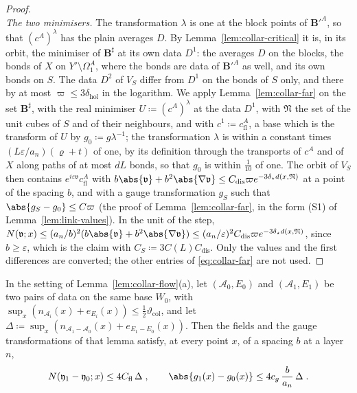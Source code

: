 \begin{proof}
\[\]
\emph{The two minimisers.} The transformation $\lambda$ is one at the block points of $\mathbf B'^A$, so that $(c^A)^\lambda$ has the plain averages $D$. By Lemma~\ref{lem:collar-critical} it is, in its orbit, the minimiser of $\mathbf B^\sharp$ at its own data $D^1$: the averages $D$ on the blocks, the bonds of $X$ on $Y' \setminus \Omega^A_1$, where the bonds are data of $\mathbf B'^A$ as well, and its own bonds on $S$. The data $D^2$ of $V_S$ differ from $D^1$ on the bonds of $S$ only, and there by at most $\varpi \leq 3\delta_{\mathrm{hol}}$ in the logarithm. We apply Lemma~\ref{lem:collar-far} on the set $\mathbf B^\sharp$, with the real minimiser $U \coloneqq (c^A)^\lambda$ at the data $D^1$, with $\mathfrak N$ the set of the unit cubes of $S$ and of their neighbours, and with $c^1 \coloneqq c^A_{\mathrm{fl}}$, a base which is the transform of $U$ by $g_0 \coloneqq g\lambda^{-1}$; the transformation $\lambda$ is within a constant times $(L\varepsilon/a_n)(\varrho + t)$ of one, by its definition through the transports of $c^A$ and of $X$ along paths of at most $dL$ bonds, so that $g_0$ is within $\frac{1}{10}$ of one. The orbit of $V_S$ then contains $e^{i\varepsilon\mathfrak v}c^A_{\mathrm{fl}}$ with $b\abs{\mathfrak v} + b^2\abs{\nabla\mathfrak v} \leq C_{\mathrm{dis}}\varpi e^{-3\delta_\star d(x,\mathfrak N)}$ at a point of the spacing $b$, and with a gauge transformation $g_S$ such that $\abs{g_S - g_0} \leq C\varpi$ (the proof of Lemma~\ref{lem:collar-far}, in the form (S1) of Lemma~\ref{lem:link-values}). In the unit of the step, $N(\mathfrak v; x) \leq (a_n/b)^2(b\abs{\mathfrak v} + b^2\abs{\nabla\mathfrak v}) \leq (a_n/\varepsilon)^2C_{\mathrm{dis}}\varpi e^{-3\delta_\star d(x,\mathfrak N)}$, since $b \geq \varepsilon$, which is the claim with $C_S \coloneqq 3C(L)C_{\mathrm{dis}}$. Only the values and the first differences are converted; the other entries of \eqref{eq:collar-far} are not used.
\end{proof}


\begin{lemma}\label{lem:data-analytic}
In the setting of Lemma~\ref{lem:collar-flow}(a), let $(\mathcal A_0, E_0)$ and $(\mathcal A_1, E_1)$ be two pairs of data on the same base $W_0$, with $\sup_x(n_{\mathcal A_i}(x) + e_{E_i}(x)) \leq \frac{1}{2}\vartheta_{\mathrm{col}}$, and let $\Delta \coloneqq \sup_x(n_{\mathcal A_1 - \mathcal A_0}(x) + e_{E_1 - E_0}(x))$. Then the fields and the gauge transformations of that lemma satisfy, at every point $x$, of a spacing $b$ at a layer $n$,
\[
    N(\mathfrak y_1 - \mathfrak y_0; x) \leq 4C_{\mathrm{fl}}\,\Delta\;,
    \qquad
    \abs{g_1(x) - g_0(x)} \leq 4c_g\,\frac{b}{a_n}\,\Delta\;.
\]
\end{lemma}

